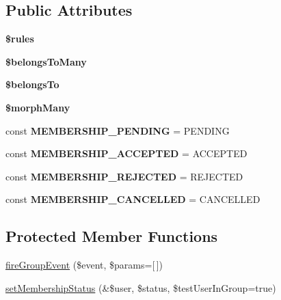 \subsection*{Public Attributes}
\begin{DoxyCompactItemize}
\item 
{\bfseries \$rules}
\item 
{\bfseries \$belongs\+To\+Many}
\item 
{\bfseries \$belongs\+To}
\item 
{\bfseries \$morph\+Many}
\item 
\hypertarget{classDMA_1_1Friends_1_1Models_1_1UserGroup_a7c8222c3e74df7e5f392db954bc6e70b}{}const {\bfseries M\+E\+M\+B\+E\+R\+S\+H\+I\+P\+\_\+\+P\+E\+N\+D\+I\+N\+G} = \textquotesingle{}P\+E\+N\+D\+I\+N\+G\textquotesingle{}\label{classDMA_1_1Friends_1_1Models_1_1UserGroup_a7c8222c3e74df7e5f392db954bc6e70b}

\item 
\hypertarget{classDMA_1_1Friends_1_1Models_1_1UserGroup_a7c23f715047baa55b359250eb7ec3936}{}const {\bfseries M\+E\+M\+B\+E\+R\+S\+H\+I\+P\+\_\+\+A\+C\+C\+E\+P\+T\+E\+D} = \textquotesingle{}A\+C\+C\+E\+P\+T\+E\+D\textquotesingle{}\label{classDMA_1_1Friends_1_1Models_1_1UserGroup_a7c23f715047baa55b359250eb7ec3936}

\item 
\hypertarget{classDMA_1_1Friends_1_1Models_1_1UserGroup_a4d38303c9b869050114862be4674191f}{}const {\bfseries M\+E\+M\+B\+E\+R\+S\+H\+I\+P\+\_\+\+R\+E\+J\+E\+C\+T\+E\+D} = \textquotesingle{}R\+E\+J\+E\+C\+T\+E\+D\textquotesingle{}\label{classDMA_1_1Friends_1_1Models_1_1UserGroup_a4d38303c9b869050114862be4674191f}

\item 
\hypertarget{classDMA_1_1Friends_1_1Models_1_1UserGroup_a40fdb6407bcd12e19a13706ced558e40}{}const {\bfseries M\+E\+M\+B\+E\+R\+S\+H\+I\+P\+\_\+\+C\+A\+N\+C\+E\+L\+L\+E\+D} = \textquotesingle{}C\+A\+N\+C\+E\+L\+L\+E\+D\textquotesingle{}\label{classDMA_1_1Friends_1_1Models_1_1UserGroup_a40fdb6407bcd12e19a13706ced558e40}

\end{DoxyCompactItemize}
\subsection*{Protected Member Functions}
\begin{DoxyCompactItemize}
\item 
\hyperlink{classDMA_1_1Friends_1_1Models_1_1UserGroup_a1d29514398539f2e5579d0cc4c6a26fa}{fire\+Group\+Event} (\$event, \$params=\mbox{[}$\,$\mbox{]})
\item 
\hyperlink{classDMA_1_1Friends_1_1Models_1_1UserGroup_a7a52268ecbdd67ab80d28d65a8149a5a}{set\+Membership\+Status} (\&\$user, \$status, \$test\+User\+In\+Group=true)
\end{DoxyCompactItemize}
